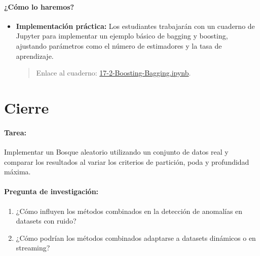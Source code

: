 \documentclass[a4,11pt]{aleph-notas}
\begin{document}
\paragraph{¿Cómo lo haremos?}  
\begin{itemize}[leftmargin=*]
    \item \textbf{Implementación práctica:}  
    Los estudiantes trabajarán con un cuaderno de Jupyter para implementar un ejemplo básico de bagging y boosting, ajustando parámetros como el número de estimadores y la tasa de aprendizaje.
    \begin{quote}
        Enlace al cuaderno: \href{https://colab.research.google.com/github/andres-merino/AprendizajeAutomaticoInicial-05-N0105/blob/main/2-Notebooks/17-2-Boosting-Bagging.ipynb}{17-2-Boosting-Bagging.ipynb}.
    \end{quote}
\end{itemize}


\section*{Cierre}  

\paragraph{Tarea:}  
Implementar un Bosque aleatorio utilizando un conjunto de datos real y comparar los resultados al variar los criterios de partición, poda y profundidad máxima.  

\paragraph{Pregunta de investigación:}  
\begin{enumerate}[leftmargin=*]  
    \item ¿Cómo influyen los métodos combinados en la detección de anomalías en datasets con ruido?
    \item ¿Cómo podrían los métodos combinados adaptarse a datasets dinámicos o en streaming?
\end{enumerate}  
\end{document}
